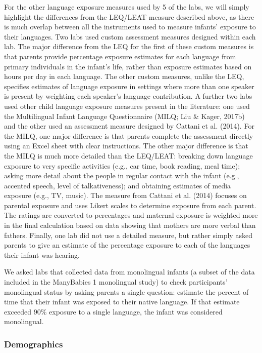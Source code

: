 \documentclass[,man,floatsintext]{apa6}
\begin{document}
For the other language exposure measures used by 5 of the labs, we will simply highlight the differences from the LEQ/LEAT measure described above, as there is much overlap between all the instruments used to measure infants' exposure to their languages. Two labs used custom assessment measures designed within each lab. The major difference from the LEQ for the first of these custom measures is that parents provide percentage exposure estimates for each language from primary individuals in the infant's life, rather than exposure estimates based on hours per day in each language. The other custom measures, unlike the LEQ, specifies estimates of language exposure in settings where more than one speaker is present by weighting each speaker's language contribution. A further two labs used other child language exposure measures present in the literature: one used the Multilingual Infant Language Questionnaire (MILQ; Liu \& Kager, 2017b) and the other used an assessment measure designed by Cattani et al. (2014). For the MILQ, one major difference is that parents complete the assessment directly using an Excel sheet with clear instructions. The other major difference is that the MILQ is much more detailed than the LEQ/LEAT: breaking down language exposure to very specific activities (e.g., car time, book reading, meal time); asking more detail about the people in regular contact with the infant (e.g., accented speech, level of talkativeness); and obtaining estimates of media exposure (e.g., TV, music). The measure from Cattani et al. (2014) focuses on parental exposure and uses Likert scales to determine exposure from each parent. The ratings are converted to percentages and maternal exposure is weighted more in the final calculation based on data showing that mothers are more verbal than fathers. Finally, one lab did not use a detailed measure, but rather simply asked parents to give an estimate of the percentage exposure to each of the languages their infant was hearing.

We asked labs that collected data from monolingual infants (a subset of the data included in the ManyBabies 1 monolingual study) to check participants' monolingual status by asking parents a single question: estimate the percent of time that their infant was exposed to their native language. If that estimate exceeded 90\% exposure to a single language, the infant was considered monolingual.

\hypertarget{demographics}{%
\subsubsection{Demographics}\label{demographics}}
\end{document}
